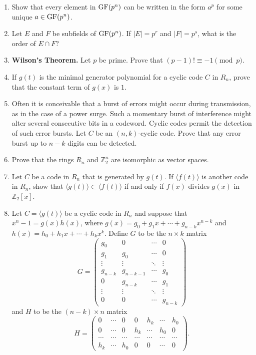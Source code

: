 {\begin{enumerate}
\bf\item\rm
Show that every element in ${\rm GF}(p^n)$ can be written in the form
$a^p$ for some unique $a \in {\rm GF}(p^n)$.


\bf\item\rm
Let $E$ and $F$ be subfields of ${\rm GF}(p^n)$. If $|E| = p^r$ and
$|F| = p^s$, what is the order of $E \cap F$? 


\bf\item\rm
{\bf Wilson's Theorem.}
Let $p$ be prime.  Prove that $(p-1)! \equiv -1 \pmod{p}$. 


\bf\item\rm
If $g(t)$ is the minimal generator polynomial for a cyclic code $C$ in
$R_n$, prove that the constant term of $g(x)$ is $1$.


\bf\item\rm
Often it is conceivable that a burst of errors might occur during
transmission, as in the case of a power surge.  Such a momentary burst
of interference might alter several consecutive bits in a codeword.
Cyclic codes permit the detection of such error bursts. Let $C$ be an
$(n,k)$-cyclic code. Prove that any error burst up to $n-k$ digits can
be detected.  


\bf\item\rm
Prove that the rings $R_n$ and ${\mathbb Z}_2^n$ are isomorphic as vector
spaces. 


\bf\item\rm
Let $C$ be a code in $R_n$ that is generated by $g(t)$. If $\langle
f(t) \rangle$ is another code in $R_n$, show that $\langle g(t) \rangle
\subset \langle f(t) \rangle$ if and only if $f(x)$ divides $g(x)$ in
${\mathbb Z}_2[x]$.


\bf\item\rm
Let $C = \langle g(t) \rangle$ be a cyclic code in $R_n$ and suppose
that $x^n - 1 = g(x) h(x)$, where $g(x) = g_0 + g_1 x + \cdots +
g_{n-k} x^{n-k}$ and $h(x) = h_0 + h_1 x +  \cdots + h_k x^k$. Define
$G$ to be the $n \times k$ matrix
$$
G = 
\left(
\begin{array}{cccc}
g_0 & 0   & \cdots & 0 \\
g_1 & g_0 & \cdots & 0 \\
\vdots & \vdots &\ddots & \vdots \\
g_{n-k}   & g_{n-k-1} & \cdots & g_0 \\
0   & g_{n-k} & \cdots & g_{1} \\
\vdots & \vdots & \ddots & \vdots \\
0   & 0 & \cdots & g_{n-k}
\end{array}
\right)
$$
and $H$ to be the $(n-k) \times n$ matrix 
$$
H =
\left(
\begin{array}{cccccccc}
0   & \cdots & 0   & 0      & h_k    & \cdots & h_0 \\
0   & \cdots & 0   & h_k    & \cdots & h_0    & 0 \\
\cdots & \cdots & \cdots  & \cdots & \cdots & \cdots & \cdots  \\
h_k & \cdots & h_0 & 0      & 0      & \cdots & 0 
\end{array}
\right).
$$
\begin{enumerate}


\end{enumerate}
\end{enumerate}}
